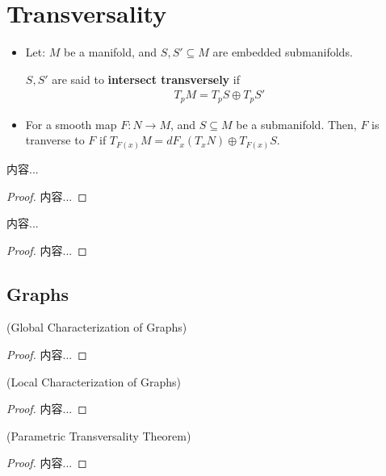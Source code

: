 \documentclass[Total.tex]{subfiles}
\begin{document}
		\section{Transversality}
		\begin{Def}
			\begin{itemize}
				\item 
				Let: $M$ be a manifold, and $S,S'\subseteq M$ are embedded submanifolds. 	
				
				$S,S'$ are said to \textbf{intersect transversely} if
				\begin{gather*}
					T_p M=T_p S\oplus T_p S'
				\end{gather*}
				
				\item For a smooth map $F:N\rightarrow M$, and $S\subseteq M$ be a submanifold. Then, $F$ is tranverse to $F$ if $T_{F(x)} M=dF_{x }(T_x N)\oplus T_{F(x)} S$. 
			\end{itemize}
		\end{Def}
		
		\begin{proposition}
			内容...
		\end{proposition}
		\begin{proof}
			内容...
		\end{proof}
		
		\begin{corollary}
			内容...
		\end{corollary}
		\begin{proof}
			内容...
		\end{proof}
		\subsection{Graphs}
			\begin{proposition}
				(Global Characterization of Graphs)
			\end{proposition}
			\begin{proof}
				内容...
			\end{proof}
			
			\begin{proposition}
				(Local Characterization of Graphs)
			\end{proposition}
			\begin{proof}
				内容...
			\end{proof}
			
			\begin{proposition}
				(Parametric Transversality Theorem)
			\end{proposition}
			\begin{proof}
				内容...
			\end{proof}
\end{document}
